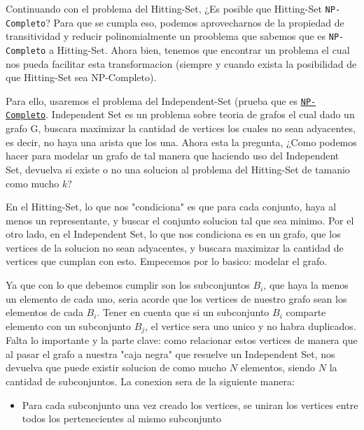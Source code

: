 Continuando con el problema del Hitting-Set, ¿Es posible que Hitting-Set \in \texttt{NP-Completo}?
Para que se cumpla eso, podemos aprovecharnos de la propiedad de transitividad y reducir polinomialmente un prooblema que sabemos que es \texttt{NP-Completo} a Hitting-Set. Ahora bien, tenemos que encontrar un problema el cual nos pueda facilitar esta transformacion (siempre y cuando exista la posibilidad de que Hitting-Set sea NP-Completo).

Para ello, usaremos el problema del Independent-Set (prueba que es \href{https://www.geeksforgeeks.org/proof-that-independent-set-in-graph-theory-is-np-complete/}{\texttt{NP-Completo}}. Independent Set es un problema sobre teoria de grafos el cual dado un grafo G, buscara maximizar la cantidad de vertices los cuales no sean adyacentes, es decir, no haya una arista que los una. Ahora esta la pregunta, ¿Como podemos hacer para modelar un grafo de tal manera que haciendo uso del Independent Set, devuelva si existe o no una solucion al problema del Hitting-Set de tamanio como mucho $k$? 

En el Hitting-Set, lo que nos "condiciona" es que para cada conjunto, haya al menos un representante, y buscar el conjunto solucion tal que sea minimo. Por el otro lado, en el Independent Set, lo que nos condiciona es en un grafo, que los vertices de la solucion no sean adyacentes, y buscara maximizar la cantidad de vertices que cumplan con esto. Empecemos por lo basico: modelar el grafo.

Ya que con lo que debemos cumplir son los subconjuntos $B_i$, que haya la menos un elemento de cada uno, seria acorde que los vertices de nuestro grafo sean los elementos de cada $B_i$. Tener en cuenta que si un subconjunto $B_i$ comparte elemento con un subconjunto $B_j$, el vertice sera uno unico y no habra duplicados. Falta lo importante y la parte clave: como relacionar estos vertices de manera que al pasar el grafo a nuestra "caja negra" que resuelve un Independent Set, nos devuelva que puede existir solucion de como mucho $N$ elementos, siendo $N$ la cantidad de subconjuntos. La conexion sera de la siguiente manera:
\begin{itemize}
    \item Para cada subconjunto una vez creado los vertices, se uniran los vertices entre todos los pertenecientes al mismo subconjunto
\end{itemize}